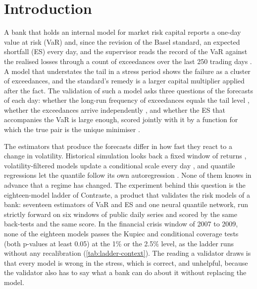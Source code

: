 \section{Introduction}
\label{sec:introduction}

A bank that holds an internal model for market risk capital reports a one-day value at risk (VaR) and, since the revision of the Basel standard, an expected shortfall (ES) every day, and the supervisor reads the record of the VaR against the realised losses through a count of exceedances over the last 250 trading days \citep{bcbs1996,bcbsmar32}. A model that understates the tail in a stress period shows the failure as a cluster of exceedances, and the standard's remedy is a larger capital multiplier applied after the fact. The validation of such a model asks three questions of the forecasts of each day: whether the long-run frequency of exceedances equals the tail level \citep{kupiec1995}, whether the exceedances arrive independently \citep{christoffersen1998}, and whether the ES that accompanies the VaR is large enough, scored jointly with it by a function for which the true pair is the unique minimiser \citep{fissler2016,pattonziegelchen2019}.

The estimators that produce the forecasts differ in how fast they react to a change in volatility. Historical simulation looks back a fixed window of returns \citep{pritsker2006,boudoukh1998}, volatility-filtered models update a conditional scale every day \citep{bollerslev1986,mcneilfrey2000,barone1999}, and quantile regressions let the quantile follow its own autoregression \citep{engle2004}. None of them knows in advance that a regime has changed. The experiment behind this question is the eighteen-model ladder of Contraste, a product that validates the risk models of a bank: seventeen estimators of VaR and ES and one neural quantile network, run strictly forward on six windows of public daily series and scored by the same back-tests and the same score. In the financial crisis window of 2007 to 2009, none of the eighteen models passes the Kupiec and conditional coverage tests (both p-values at least 0.05) at the 1\% or the 2.5\% level, as the ladder runs without any recalibration (\cref{tab:ladder-context}). The reading a validator draws is that every model is wrong in the stress, which is correct, and unhelpful, because the validator also has to say what a bank can do about it without replacing the model.

